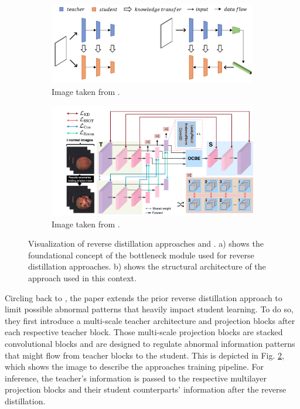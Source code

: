 \begin{figure}[H]
 \captionsetup[subfigure]{justification=centering}
\centering
 \begin{subfigure}[b]{0.4\textwidth} %
 \centering
 \includegraphics[width=\textwidth]{figures/revdist_bottleneck.png}
 \caption{Image taken from \cite{Deng_2022basicrevdist}.}
 \label{fig:revdistbottleneck}
 \end{subfigure}
 \hspace{0.05\textwidth} %
 \begin{subfigure}[b]{0.4\textwidth} %
 \centering
 \includegraphics[width=\textwidth]{figures/revdistpipeline.png}
 \caption{Image taken from \cite{revdist2023}.}
 \label{fig:revdistpipeline}
 \end{subfigure}
 
 \caption{Visualization of reverse distillation approaches \cite{Deng_2022basicrevdist} and \cite{revdist2023}. a) shows 
 the foundational concept of the bottleneck module used for reverse distillation approaches. b) shows the structural 
architecture of the approach used in this context.}
\label{fig:revdistviz}
\end{figure}


Circling back to \cite{revdist2023}, the paper extends the prior reverse distillation approach to limit possible abnormal patterns that heavily impact student learning. To do so, they 
first introduce a multi-scale teacher architecture and projection blocks after each respective teacher block. Those multi-scale projection blocks are stacked convolutional blocks 
and are designed to regulate abnormal information patterns that might flow from teacher blocks to the student. This is depicted in Fig. \ref{fig:revdistpipeline}, which shows the image to describe the 
approaches training pipeline. For inference, the teacher's information is passed to the respective multilayer projection blocks and their student counterparts' information after the 
reverse distillation.



